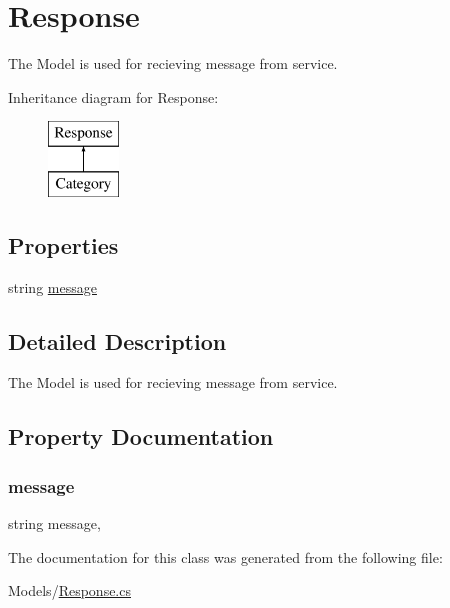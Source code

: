 \hypertarget{classWildlifeTrackingApp_1_1Models_1_1Response}{}\section{Response}
\label{classWildlifeTrackingApp_1_1Models_1_1Response}


The Model is used for recieving message from service.  


Inheritance diagram for Response\+:\begin{figure}[H]
\begin{center}
\leavevmode
\includegraphics[height=2.000000cm]{classWildlifeTrackingApp_1_1Models_1_1Response}
\end{center}
\end{figure}
\subsection*{Properties}
\begin{DoxyCompactItemize}
\item 
string \hyperlink{classWildlifeTrackingApp_1_1Models_1_1Response_ae1ed0d7a6f352c7ee3ad978429822c6f}{message}
\end{DoxyCompactItemize}


\subsection{Detailed Description}
The Model is used for recieving message from service. 



\subsection{Property Documentation}
\mbox{\label{classWildlifeTrackingApp_1_1Models_1_1Response_ae1ed0d7a6f352c7ee3ad978429822c6f}} 
\subsubsection{\texorpdfstring{message}{message}}
{\footnotesize\ttfamily string message\hspace{0.3cm}{\ttfamily [get]}, {\ttfamily [set]}}



The documentation for this class was generated from the following file\+:\begin{DoxyCompactItemize}
\item 
Models/\hyperlink{Response_8cs}{Response.\+cs}\end{DoxyCompactItemize}
